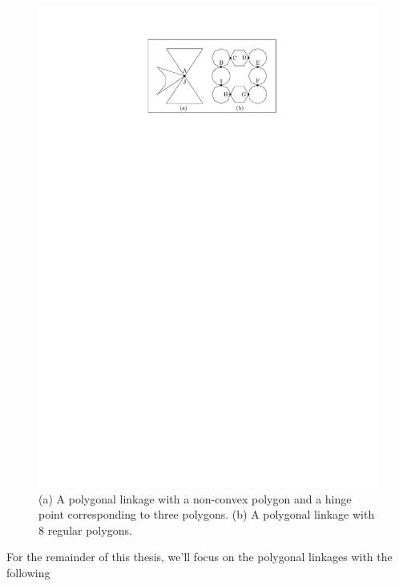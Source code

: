 \begin{figure}[h]
\begin{center}
\includegraphics[scale=1]{graphics/PolygonalLinkageExamples.pdf}
\end{center} 
\caption{(a) A polygonal linkage with a non-convex polygon and a hinge point corresponding to three 
polygons.  (b) A polygonal linkage with 8 regular polygons.}
\label{fig:linkage-2}
\end{figure}
For the remainder of this thesis, we'll focus on the polygonal linkages with the following 
